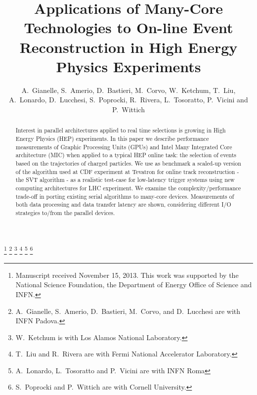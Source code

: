 \documentclass[journal]{IEEEtran}
\begin{document}
\title{Applications of Many-Core Technologies to On-line Event Reconstruction in High Energy Physics
Experiments}
\author{A.~Gianelle, 
  S.~Amerio, 
  D.~Bastieri, 
  M.~Corvo, 
  W.~Ketchum,
  T.~Liu, 
  A.~Lonardo, 
  D.~Lucchesi,
  S.~Poprocki, 
  R.~Rivera, 
  L.~Tosoratto,
  P.~Vicini
  and 
  P.~Wittich
}
\thanks{Manuscript received November 15, 2013.
This work was supported by the National Science Foundation, the
Department of Energy Office of Science and INFN.}%
\thanks{A.~Gianelle, S.~Amerio, D.~Bastieri, M.~Corvo, and D.~Lucchesi are with INFN Padova.}%
\thanks{W.~Ketchum is with Los Alamos National Laboratory.}%
\thanks{T.~Liu and R.~Rivera are with Fermi National Accelerator Laboratory.}%
\thanks{A.~Lonardo, L.~Tosoratto and P.~Vicini are with INFN Roma}%
\thanks{S.~Poprocki and P.~Wittich are with Cornell University.}%
\maketitle
\thispagestyle{empty}
\begin{abstract}
  Interest in parallel architectures applied to real time selections is 
  growing in High Energy Physics (HEP) experiments. In this paper we describe
  performance measurements of Graphic Processing Units (GPUs) and Intel Many
  Integrated Core architecture (MIC) when applied to a typical HEP online task: 
  the selection of events based on the trajectories of charged particles.
  We use as benchmark a scaled-up version of the algorithm used at CDF 
  experiment at Tevatron for online track reconstruction - the SVT algorithm - 
  as a realistic  test-case for low-latency trigger systems using new computing
  architectures for LHC experiment. We examine the
  complexity/performance trade-off in porting existing serial
  algorithms to many-core devices. Measurements of both data processing 
  and data transfer latency are shown, considering different I/O strategies 
  to/from the parallel devices. \end{abstract}
\end{document}
